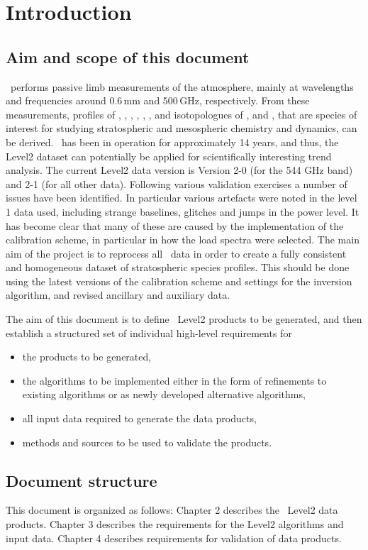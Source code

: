 \chapter{Introduction}
\label{chapter:introduction}


\setcounter{page}{1}


\section{Aim and scope of this document}
\label{sec:aim}
\smr\ performs passive limb measurements of the atmosphere,
mainly at wavelengths and frequencies around 0.6\,mm and 500\,GHz,
respectively.
From these measurements, profiles of 
, , , , 
, , and isotopologues of , and ,
that are species of interest for studying stratospheric and 
mesospheric chemistry and dynamics, can be derived. 
\smr\ has been in operation for approximately 14 years, and thus, the Level2
dataset can potentially be applied for scientifically interesting trend analysis.
The current Level2 data version is Version 2-0 (for the 544 GHz band)
and 2-1 (for all other data). 
Following various validation exercises a number of issues have been identified. 
In particular various artefacts were noted in the level 1 data used, 
including strange baselines, glitches and jumps in the power level. 
It has become clear that many of these are caused by the implementation 
of the calibration scheme, in particular in how the load spectra were selected.
The main aim of the project is to reprocess all \smr\ data in order to 
create a fully consistent and homogeneous dataset of stratospheric species profiles. 
This should be done using the latest versions of the calibration scheme and settings 
for the inversion algorithm, and revised ancillary and auxiliary data.

The aim of this document is to define \smr\ Level2 products
to be generated, and then establish a structured set of 
individual high-level requirements for
\begin{itemize}
\item the products to be generated,
\item the algorithms to be implemented either in the form of refinements to existing
  algorithms or as newly developed alternative algorithms,
\item all input data required to generate the data products,
\item methods and sources to be used to validate the products.
\end{itemize}

\section{Document structure}

This document is organized as follows:
Chapter 2 describes the \smr\ Level2 data products.
Chapter 3 describes the requirements for
the \smr Level2 algorithms and input data.
Chapter 4 describes requirements for validation
of \smr data products.


